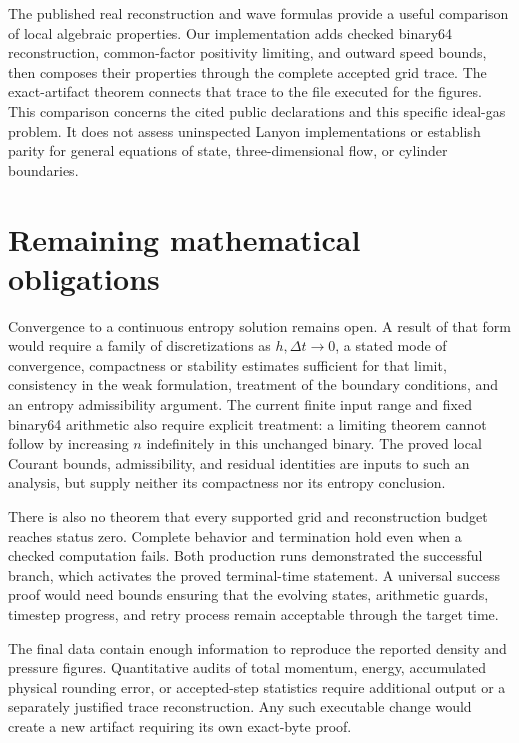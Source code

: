 \documentclass[11pt]{article}
\begin{document}
The published real reconstruction and wave formulas provide a useful comparison of local algebraic properties.  Our implementation adds checked binary64 reconstruction, common-factor positivity limiting, and outward speed bounds, then composes their properties through the complete accepted grid trace.  The exact-artifact theorem connects that trace to the file executed for the figures.  This comparison concerns the cited public declarations and this specific ideal-gas problem.  It does not assess uninspected Lanyon implementations or establish parity for general equations of state, three-dimensional flow, or cylinder boundaries.

\section{Remaining mathematical obligations}

Convergence to a continuous entropy solution remains open.  A result of that form would require a family of discretizations as $h,\Delta t\to0$, a stated mode of convergence, compactness or stability estimates sufficient for that limit, consistency in the weak formulation, treatment of the boundary conditions, and an entropy admissibility argument.  The current finite input range and fixed binary64 arithmetic also require explicit treatment: a limiting theorem cannot follow by increasing $n$ indefinitely in this unchanged binary.  The proved local Courant bounds, admissibility, and residual identities are inputs to such an analysis, but supply neither its compactness nor its entropy conclusion.

There is also no theorem that every supported grid and reconstruction budget reaches status zero.  Complete behavior and termination hold even when a checked computation fails.  Both production runs demonstrated the successful branch, which activates the proved terminal-time statement.  A universal success proof would need bounds ensuring that the evolving states, arithmetic guards, timestep progress, and retry process remain acceptable through the target time.

The final data contain enough information to reproduce the reported density and pressure figures.  Quantitative audits of total momentum, energy, accumulated physical rounding error, or accepted-step statistics require additional output or a separately justified trace reconstruction.  Any such executable change would create a new artifact requiring its own exact-byte proof.

\appendix
\end{document}

